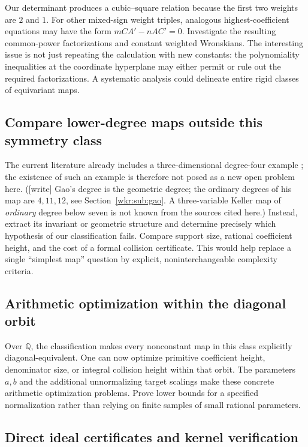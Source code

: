 \documentclass[11pt,a4paper]{article}
\numberwithin{equation}{section}
\theoremstyle{definition}
\theoremstyle{remark}
\newcommand{\Q}{\mathbb{Q}}
\newcommand{\wtag}{\textup{[write]}}%
\begin{document}
Our determinant produces a cubic--square relation because the first two
weights are $2$ and $1$. For other mixed-sign weight triples, analogous
highest-coefficient equations may have the form
$mCA'-nAC'=0$. Investigate the resulting common-power factorizations and
constant weighted Wronskians. The interesting issue is not just repeating
the calculation with new constants: the polynomiality inequalities at the
coordinate hyperplane may either permit or rule out the required
factorizations. A systematic analysis could delineate entire rigid classes
of equivariant maps.

\subsection{Compare lower-degree maps outside this symmetry class}

The current literature already includes a three-dimensional degree-four
example \cite{gao}; the existence of such an example is therefore not
posed as a new open problem here. (\wtag{} Gao's degree is the geometric
degree; the ordinary degrees of his map are $4,11,12$, see
Section~\ref{wkr:sub:gao}. A three-variable Keller map of \emph{ordinary}
degree below seven is not known from the sources cited here.) Instead, extract its invariant or
geometric structure and determine precisely which hypothesis of our
classification fails. Compare support size, rational coefficient height,
and the cost of a formal collision certificate. This would help replace a
single ``simplest map'' question by explicit, noninterchangeable complexity
criteria.

\subsection{Arithmetic optimization within the diagonal orbit}

Over $\Q$, the classification makes every nonconstant map in this class
explicitly diagonal-equivalent. One can now optimize primitive coefficient
height, denominator size, or integral collision height within that orbit.
The parameters $a,b$ and the additional unnormalizing target scalings make
these concrete arithmetic optimization problems. Prove lower bounds for a
specified normalization rather than relying on finite samples of small
rational parameters.

\subsection{Direct ideal certificates and kernel verification}
\end{document}
